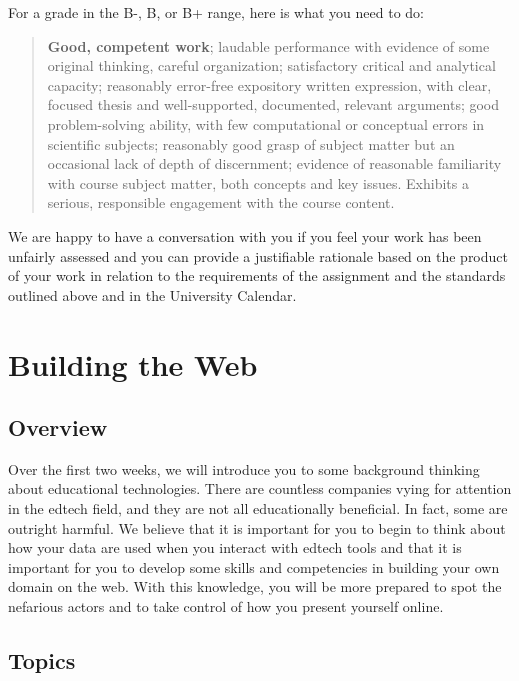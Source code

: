 \documentclass[
]{book}
\begin{document}
For a grade in the B-, B, or B+ range, here is what you need to do:

\begin{quote}
\textbf{Good, competent work}; laudable performance with evidence of some original thinking, careful organization; satisfactory critical and analytical capacity; reasonably error-free expository written expression, with clear, focused thesis and well-supported, documented, relevant arguments; good problem-solving ability, with few computational or conceptual errors in scientific subjects; reasonably good grasp of subject matter but an occasional lack of depth of discernment; evidence of reasonable familiarity with course subject matter, both concepts and key issues. Exhibits a serious, responsible engagement with the course content.
\end{quote}

We are happy to have a conversation with you if you feel your work has been unfairly assessed and you can provide a justifiable rationale based on the product of your work in relation to the requirements of the assignment and the standards outlined above and in the University Calendar.

\hypertarget{building-the-web}{%
\chapter{Building the Web}\label{building-the-web}}

\hypertarget{overview}{%
\section*{Overview}\label{overview}}

Over the first two weeks, we will introduce you to some background thinking about educational technologies. There are countless companies vying for attention in the edtech field, and they are not all educationally beneficial. In fact, some are outright harmful. We believe that it is important for you to begin to think about how your data are used when you interact with edtech tools and that it is important for you to develop some skills and competencies in building your own domain on the web. With this knowledge, you will be more prepared to spot the nefarious actors and to take control of how you present yourself online.

\hypertarget{topics}{%
\section*{Topics}\label{topics}}
\end{document}
